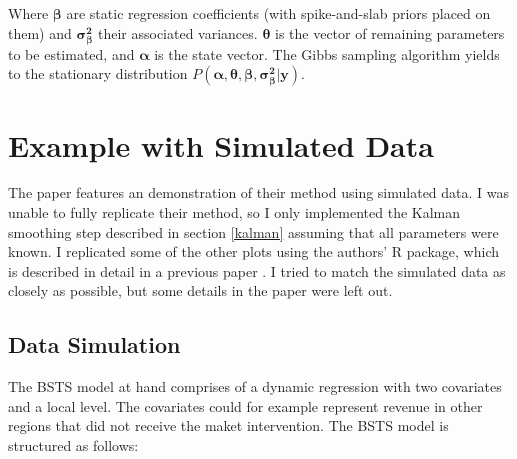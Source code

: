 \documentclass[12pt]{article}
\begin{document}
Where $\boldsymbol{\beta}$ are static regression coefficients (with spike-and-slab priors placed on them) and $\boldsymbol{\sigma^2_\beta}$ their associated variances. $\boldsymbol{\theta}$ is the vector of remaining parameters to be estimated, and $\boldsymbol{\alpha}$ is the state vector. The Gibbs sampling algorithm yields to the stationary distribution $P(\boldsymbol{\alpha}, \boldsymbol{\theta}, \boldsymbol{\beta},  \boldsymbol{\sigma^2_{\beta}}|\boldsymbol{y})$.

\section{Example with Simulated Data}\label{toy}
The paper features an demonstration of their method using simulated data. I was unable to fully replicate their method, so I only implemented the Kalman smoothing step described in section \ref{kalman} assuming that all parameters were known. I replicated some of the other plots using the authors' R package, which is described in detail in a previous paper \cite{scott2014predicting}. I tried to match the simulated data as closely as possible, but some details in the paper were left out.

\subsection{Data Simulation}
The BSTS model at hand comprises of a dynamic regression with two covariates and a local level. The covariates could for example represent revenue in other regions that did not receive the maket intervention. The BSTS model is structured as follows:
\end{document}
